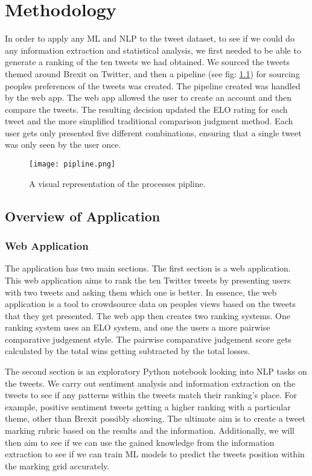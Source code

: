 
\chapter{Methodology}
	\label{chap:typesetting}
	In order to apply any ML and NLP to the tweet dataset, to see if we could do any information extraction and statistical analysis, we first needed to be able to generate a ranking of the ten tweets we had obtained. We sourced the tweets themed around Brexit on Twitter, and then a pipeline (see fig: \ref{fig:pipeline}) for sourcing peoples preferences of the tweets was created. The pipeline created was handled by the web app. The web app allowed the user to create an account and then compare the tweets. The resulting decision updated the ELO rating for each tweet and the more simplified traditional comparison judgment method. Each user gets only presented five different combinations, ensuring that a single tweet was only seen by the user once.
	
	\begin{figure}[b]
		\texttt{[image: pipline.png]}
		\caption{A visual representation of the processes pipline.}
		\label{fig:pipeline}
		
	\end{figure}

	\section{Overview of Application}
	
	\subsection{Web Application}
	The application has two main sections. The first section is a web application. This web application aims to rank the ten Twitter tweets by presenting users with two tweets and asking them which one is better. In essence, the web application is a tool to crowdsource data on peoples views based on the tweets that they get presented. The web app then creates two ranking systems. One ranking system uses an ELO system, and one the users a more pairwise comparative judgement style. The pairwise comparative judgement score gets calculated by the total wins getting subtracted by the total losses. 
	
	The second section is an exploratory Python notebook looking into NLP tasks on the tweets. We carry out sentiment analysis and information extraction on the tweets to see if any patterns within the tweets match their ranking's place. For example, positive sentiment tweets getting a higher ranking with a particular theme, other than Brexit possibly showing. The ultimate aim is to create a tweet marking rubric based on the results and the information. Additionally, we will then aim to see if we can use the gained knowledge from the information extraction to see if we can train ML models to predict the tweets position within the marking grid accurately.
	
